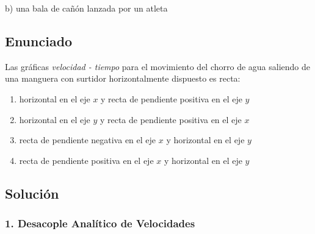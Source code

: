 \documentclass[12pt, a4paper]{article}
\begin{document}
\begin{tcolorbox}[colback=green!5!white, colframe=green!50!black, title=Respuesta Final]
\centering \Large b) una bala de cañón lanzada por un atleta
\end{tcolorbox}

\newpage

\subsection*{Enunciado}
Las gráficas \textit{velocidad - tiempo} para el movimiento del chorro de agua saliendo de una manguera con surtidor horizontalmente dispuesto es recta:

\begin{center}
\end{center}

\begin{enumerate}[label=\alph*)]
    \item horizontal en el eje $x$ y recta de pendiente positiva en el eje $y$
    \item horizontal en el eje $y$ y recta de pendiente positiva en el eje $x$
    \item recta de pendiente negativa en el eje $x$ y horizontal en el eje $y$
    \item recta de pendiente positiva en el eje $x$ y horizontal en el eje $y$
\end{enumerate}

\subsection*{Solución}

\subsubsection*{1. Desacople Analítico de Velocidades}
\end{document}
